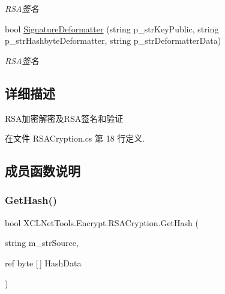 \begin{DoxyCompactItemize}
\begin{DoxyCompactList}\small\item\em R\+S\+A签名 \end{DoxyCompactList}\item 
bool \hyperlink{class_x_c_l_net_tools_1_1_encrypt_1_1_r_s_a_cryption_a063bdecbb1d58871f898f1cc71ad7572}{Signature\+Deformatter} (string p\+\_\+str\+Key\+Public, string p\+\_\+str\+Hashbyte\+Deformatter, string p\+\_\+str\+Deformatter\+Data)
\begin{DoxyCompactList}\small\item\em R\+S\+A签名 \end{DoxyCompactList}\end{DoxyCompactItemize}


\subsection{详细描述}
R\+S\+A加密解密及\+R\+S\+A签名和验证 



在文件 R\+S\+A\+Cryption.\+cs 第 18 行定义.



\subsection{成员函数说明}
\mbox{\label{class_x_c_l_net_tools_1_1_encrypt_1_1_r_s_a_cryption_af5565911cb529cf571c4ffa79ee3cd98}} 
\subsubsection{\texorpdfstring{Get\+Hash()}{GetHash()}\hspace{0.1cm}{\footnotesize\ttfamily [1/4]}}
{\footnotesize\ttfamily bool X\+C\+L\+Net\+Tools.\+Encrypt.\+R\+S\+A\+Cryption.\+Get\+Hash (\begin{DoxyParamCaption}\item[{string}]{m\+\_\+str\+Source,  }\item[{ref byte \mbox{[}$\,$\mbox{]}}]{Hash\+Data }\end{DoxyParamCaption})}



